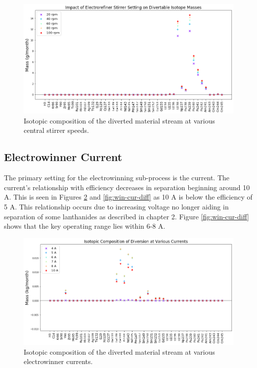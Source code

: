 \begin{figure}
	\includegraphics[width=\linewidth]{images/rotation-sa-diff}
	\caption{Isotopic composition of the diverted material stream at various central stirrer speeds.}
	\label{fig:ref-rot-diff}
\end{figure}

\FloatBarrier

\subsection{Electrowinner Current}

The primary setting for the electrowinning sub-process is the current. The current's relationship with efficiency decreases in separation beginning around 10 A.
This is seen in Figures \ref{fig:win-cur-sa} and \ref{fig:win-cur-diff} as 10 A is below the efficiency of 5 A. This relationship occurs due to increasing voltage no longer aiding in separation of some lanthanides as described in chapter 2. Figure \ref{fig:win-cur-diff} shows that the key operating range lies within 6-8 A.

\begin{figure}
	\includegraphics[width=\linewidth]{images/current-sa-comp}
	\caption{Isotopic composition of the diverted material stream at various electrowinner currents.}
	\label{fig:win-cur-sa}
\end{figure}

